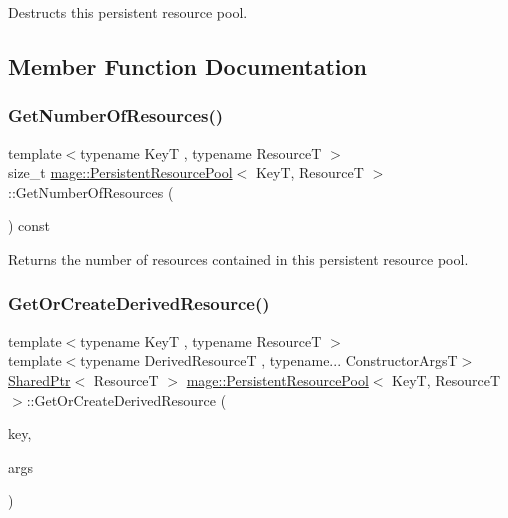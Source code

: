 Destructs this persistent resource pool. 

\subsection{Member Function Documentation}
\hypertarget{classmage_1_1_persistent_resource_pool_a16019bc52d2a9eca0d0e239aac4c0566}{}\label{classmage_1_1_persistent_resource_pool_a16019bc52d2a9eca0d0e239aac4c0566} 
\subsubsection{\texorpdfstring{Get\+Number\+Of\+Resources()}{GetNumberOfResources()}}
{\footnotesize\ttfamily template$<$typename KeyT , typename ResourceT $>$ \\
size\+\_\+t \hyperlink{classmage_1_1_persistent_resource_pool}{mage\+::\+Persistent\+Resource\+Pool}$<$ KeyT, ResourceT $>$\+::Get\+Number\+Of\+Resources (\begin{DoxyParamCaption}{ }\end{DoxyParamCaption}) const}

Returns the number of resources contained in this persistent resource pool. \hypertarget{classmage_1_1_persistent_resource_pool_a1423605c78293295129fde4afa18637a}{}\label{classmage_1_1_persistent_resource_pool_a1423605c78293295129fde4afa18637a} 
\subsubsection{\texorpdfstring{Get\+Or\+Create\+Derived\+Resource()}{GetOrCreateDerivedResource()}}
{\footnotesize\ttfamily template$<$typename KeyT , typename ResourceT $>$ \\
template$<$typename Derived\+ResourceT , typename... Constructor\+ArgsT$>$ \\
\hyperlink{namespacemage_a1e01ae66713838a7a67d30e44c67703e}{Shared\+Ptr}$<$ ResourceT $>$ \hyperlink{classmage_1_1_persistent_resource_pool}{mage\+::\+Persistent\+Resource\+Pool}$<$ KeyT, ResourceT $>$\+::Get\+Or\+Create\+Derived\+Resource (\begin{DoxyParamCaption}\item[{const KeyT \&}]{key,  }\item[{Constructor\+ArgsT \&\&...}]{args }\end{DoxyParamCaption})}

